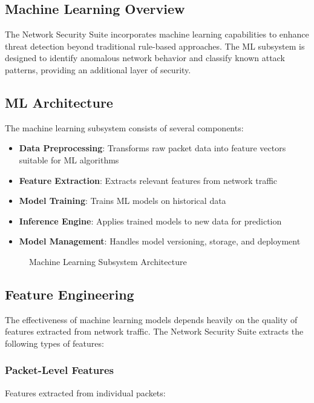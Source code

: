 \subsection{Machine Learning Overview}
The Network Security Suite incorporates machine learning capabilities to enhance threat detection beyond traditional rule-based approaches. The ML subsystem is designed to identify anomalous network behavior and classify known attack patterns, providing an additional layer of security.

\subsection{ML Architecture}
The machine learning subsystem consists of several components:

\begin{itemize}
    \item \textbf{Data Preprocessing}: Transforms raw packet data into feature vectors suitable for ML algorithms
    \item \textbf{Feature Extraction}: Extracts relevant features from network traffic
    \item \textbf{Model Training}: Trains ML models on historical data
    \item \textbf{Inference Engine}: Applies trained models to new data for prediction
    \item \textbf{Model Management}: Handles model versioning, storage, and deployment
\end{itemize}

\begin{figure}[H]
    \centering

    \caption{Machine Learning Subsystem Architecture}
    \label{fig:ml_architecture}
\end{figure}

\subsection{Feature Engineering}
The effectiveness of machine learning models depends heavily on the quality of features extracted from network traffic. The Network Security Suite extracts the following types of features:

\subsubsection{Packet-Level Features}
Features extracted from individual packets:

